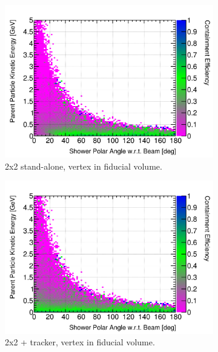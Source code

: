 \documentclass[10pt,a4paper,openany]{article}
\begin{document}
\begin{figure}[!htb]
\begin{subfigure}[b]{0.49\textwidth}
		\label{}
	\end{subfigure}	
	\begin{subfigure}[b]{0.49\textwidth}
		\centering
    \includegraphics[width=1.0\textwidth]{EM_cont_eff_2x2_fiducial.png}
		\caption{2x2 stand-alone, vertex in fiducial volume.}
		\label{}
	\end{subfigure}	
	\hfill
	\begin{subfigure}[b]{0.49\textwidth}
		\centering
		\includegraphics[width=1.0\textwidth]{EM_cont_eff_2x2_Scintillator_fiducial_gap.png}
		\caption{2x2 + tracker, vertex in fiducial volume.}
		\label{}
	\end{subfigure}
	\begin{subfigure}[b]{0.49\textwidth}
		\centering

\end{subfigure}
\end{figure}
\end{document}
